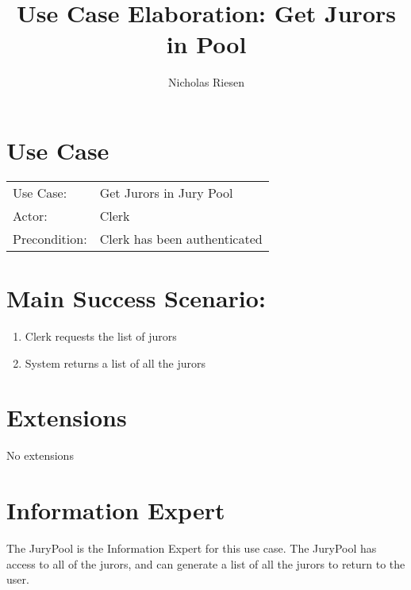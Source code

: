 \documentclass{article}
\title{Use Case Elaboration: Get Jurors in Pool}
\author{Nicholas Riesen}
\begin{document}
\maketitle

\section*{Use Case}
\begin{tabular}{l l}
  Use Case:     & Get Jurors in Jury Pool     \\
  Actor:        & Clerk                       \\
  Precondition: & Clerk has been authenticated\\
\end{tabular}

\section*{Main Success Scenario:}
\begin{enumerate}
  \item Clerk requests the list of jurors
  \item System returns a list of all the jurors
\end{enumerate}

\section*{Extensions}
No extensions

\section*{Information Expert}
The JuryPool is the Information Expert for this use case. The JuryPool has access to all of the jurors, and can generate a list of all the jurors to return to the user.
\end{document}
